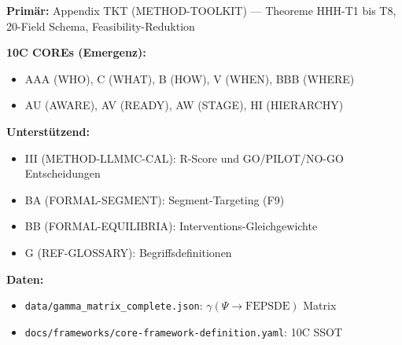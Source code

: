 \begin{tcolorbox}[colback=gray!5!white, colframe=gray!75!black,
    title=Appendix-Referenzen]

\textbf{Primär:} Appendix TKT (METHOD-TOOLKIT) --- Theoreme HHH-T1 bis T8, 20-Field Schema, Feasibility-Reduktion

\textbf{10C COREs (Emergenz):}
\begin{itemize}[nosep]
\item AAA (WHO), C (WHAT), B (HOW), V (WHEN), BBB (WHERE)
\item AU (AWARE), AV (READY), AW (STAGE), HI (HIERARCHY)
\end{itemize}

\textbf{Unterstützend:}
\begin{itemize}[nosep]
\item III (METHOD-LLMMC-CAL): R-Score und GO/PILOT/NO-GO Entscheidungen
\item BA (FORMAL-SEGMENT): Segment-Targeting (F9)
\item BB (FORMAL-EQUILIBRIA): Interventions-Gleichgewichte
\item G (REF-GLOSSARY): Begriffsdefinitionen
\end{itemize}

\textbf{Daten:}
\begin{itemize}[nosep]
\item \texttt{data/gamma\_matrix\_complete.json}: $\gamma(\Psi \rightarrow \text{FEPSDE})$ Matrix
\item \texttt{docs/frameworks/core-framework-definition.yaml}: 10C SSOT
\end{itemize}

\end{tcolorbox}

